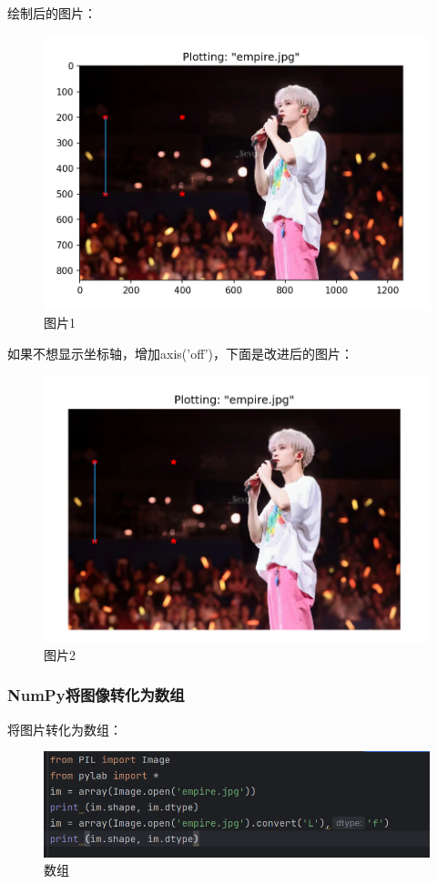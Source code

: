 \documentclass{ctexart}
\begin{document}
	绘制后的图片：
	\begin{figure}[H]
		\centering
		\includegraphics[scale=0.50]{3.90}
		\caption{图片1}
	\end{figure}
	如果不想显示坐标轴，增加axis('off')，下面是改进后的图片：
	\begin{figure}[H]
		\centering
		\includegraphics[scale=0.50]{3.94}
		\caption{图片2}
	\end{figure}
	\subsubsection{NumPy将图像转化为数组}
	将图片转化为数组：
	\begin{figure}[H]
		\centering
		\includegraphics[scale=0.50]{3.95}
		\caption{数组}
	\end{figure}
	
\end{document}
